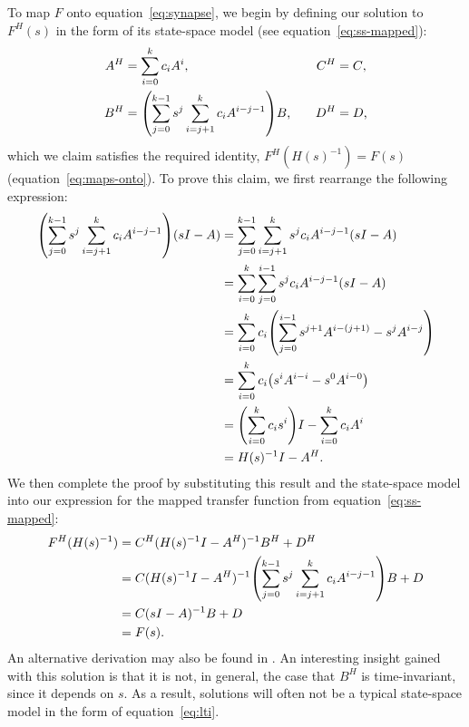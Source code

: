 \documentclass[12pt]{article}
\theoremstyle{definition}
\let\originalleft\left
\let\originalright\right
\renewcommand{\left}{\mathopen{}\mathclose\bgroup\originalleft}
\renewcommand{\right}{\aftergroup\egroup\originalright}
\begin{document}
To map $F$ onto equation~\ref{eq:synapse}, we begin by defining our solution to $F^{H}(s)$ in the form of its state-space model (see equation~\ref{eq:ss-mapped}):
\begin{equation} \label{eq:general-linear}
\begin{aligned}
A^H &= \sum_{i=0}^k c_i A^i \text{,} & \quad C^H &= C \text{,} \\
B^H &= \left( \sum_{j=0}^{k-1} s^j \sum_{i=j+1}^k c_i A^{i-j-1} \right) B \text{,} & \quad D^H &= D \text{,}
\end{aligned}
\end{equation}
which we claim satisfies the required identity, $F^{H}(H(s)^{-1}) = F(s)$ (equation~\ref{eq:maps-onto}).
To prove this claim, we first rearrange the following expression:
\begin{align*}
\left( \sum_{j=0}^{k-1} s^j \sum_{i=j+1}^k c_i A^{i-j-1} \right) (sI - A)  &= \sum_{j=0}^{k-1} \sum_{i=j+1}^k s^j c_i A^{i-j-1} (sI - A) \\
&= \sum_{i=0}^{k} \sum_{j=0}^{i-1} s^j c_i A^{i-j-1} (sI - A)  \\
&= \sum_{i=0}^k c_i \left( \sum_{j=0}^{i-1} s^{j+1} A^{i - (j + 1)} - s^j A^{i - j} \right) \\
&= \sum_{i=0}^k c_i \left( s^i A^{i - i} - s^0 A^{i-0} \right) \\
&= \left( \sum_{i=0}^k c_i s^i \right) I - \sum_{i=0}^k c_i A^i \\
&= H(s)^{-1}I - A^H \text{.}
\end{align*}
We then complete the proof by substituting this result and the state-space model into our expression for the mapped transfer function from equation~\ref{eq:ss-mapped}:
\begin{align*}
F^H(H(s)^{-1}) &= C^H(H(s)^{-1}I - A^H)^{-1} B^H + D^H \\
&= C(H(s)^{-1}I - A^H)^{-1} \left( \sum_{j=0}^{k-1} s^j \sum_{i=j+1}^k c_i A^{i-j-1} \right) B + D \\
&= C(sI - A)^{-1} B + D \\
&= F(s) \text{.}
\end{align*}
An alternative derivation may also be found in \citep[][section~2.2]{voelker2017neuromorphic}.
An interesting insight gained with this solution is that it is not, in general, the case that $B^H$ is time-invariant, since it depends on $s$.
As a result, solutions will often not be a typical state-space model in the form of equation~\ref{eq:lti}.
\end{document}
